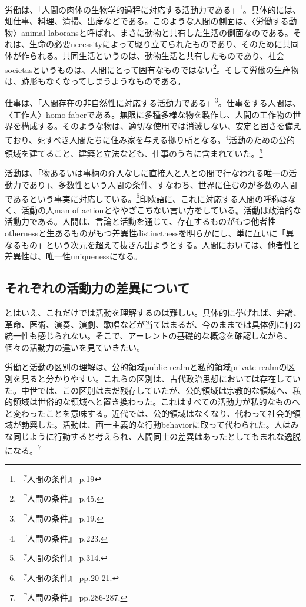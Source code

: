 \documentclass[b5j,twoside,twocolumn]{utarticle}
\begin{document}
労働は、「人間の肉体の生物学的過程に対応する活動力である」\footnote{『人間の条件』 p.19}。具体的には、畑仕事、料理、清掃、出産などである。このような人間の側面は、〈労働する動物〉animal laboransと呼ばれ、まさに動物と共有した生活の側面なのである。それは、生命の必要necessityによって駆り立てられたものであり、そのために共同体が作られる。共同生活というのは、動物生活と共有したものであり、社会societasというものは、人間にとって固有なものではない\footnote{『人間の条件』 p.45.}。そして労働の生産物は、跡形もなくなってしまうようなものである。


仕事は、「人間存在の非自然性に対応する活動力である」\footnote{『人間の条件』 p.19.}。仕事をする人間は、〈工作人〉homo faberである。無限に多種多様な物を製作し、人間の工作物の世界を構成する。そのような物は、適切な使用では消滅しない、安定と固さを備えており、死すべき人間たちに住み家を与える拠り所となる。\footnote{『人間の条件』 p.223.}活動のための公的領域を建てること、建築と立法なども、仕事のうちに含まれていた。\footnote{『人間の条件』 p.314.}


活動は、「物あるいは事柄の介入なしに直接人と人との間で行なわれる唯一の活動力であり」、多数性という人間の条件、すなわち、世界に住むのが多数の人間であるという事実に対応している。\footnote{『人間の条件』 pp.20-21.}印欧語に、これに対応する人間の呼称はなく、活動の人man of actionとややぎこちない言い方をしている。活動は政治的な活動力である。人間は、言論と活動を通じて、存在するものがもつ他者性othernessと生あるものがもつ差異性distinctnessを明らかにし、単に互いに「異なるもの」という次元を超えて抜きん出ようとする。人間においては、他者性と差異性は、唯一性uniquenessになる。

\subsection{それぞれの活動力の差異について}
とはいえ、これだけでは活動を理解するのは難しい。具体的に挙げれば、弁論、革命、医術、演奏、演劇、歌唱などが当てはまるが、今のままでは具体例に何の統一性も感じられない。そこで、アーレントの基礎的な概念を確認しながら、個々の活動力の違いを見ていきたい。


労働と活動の区別の理解は、公的領域public realmと私的領域private realmの区別を見ると分かりやすい。これらの区別は、古代政治思想においては存在していた。中世では、この区別はまだ残存していたが、公的領域は宗教的な領域へ、私的領域は世俗的な領域へと置き換わった。これはすべての活動力が私的なものへと変わったことを意味する。近代では、公的領域はなくなり、代わって社会的領域が勃興した。活動は、画一主義的な行動behaviorに取って代わられた。人はみな同じように行動すると考えられ、人間同士の差異はあったとしてもまれな逸脱になる。\footnote{『人間の条件』 pp.286-287.}
\end{document}
